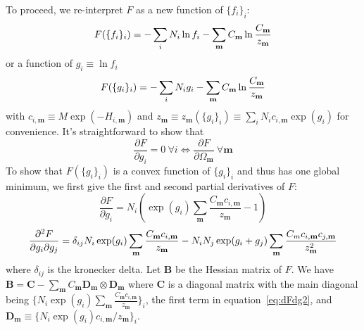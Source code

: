To proceed, we re-interpret $F$ as a new function of $\{f_{i}\}_{i}$:
\begin{equation}
F(\{f_{i}\}_{i}) = - \sum_{i}^{} N_i \ln f_{i} \\ 
-\sum_{\mathbf{m}}^{} C_{\mathbf{m}} \ln \frac{C_{\mathbf{m}}}{z_{\mathbf{m}}} 
\label{eq:Fexf}
\end{equation}
or a function of $g_{i} \equiv \ln f_{i}$
\begin{equation}
F(\{g_{i}\}_{i}) = - \sum_{i}^{} N_i g_{i} \\ 
-\sum_{\mathbf{m}}^{} C_{\mathbf{m}} \ln \frac{C_{\mathbf{m}}}{z_{\mathbf{m}}} 
\label{eq:Fexg}
\end{equation}
with $c_{i,\mathbf{m}} \equiv M \exp(-H_{i,\mathbf{m}})$ and 
$z_{\mathbf{m}} \equiv z_{\mathbf{m}}(\{g_{i}\}_{i}) \equiv \sum\limits_{i}^{} N_{i} c_{i,\mathbf{m}} \exp(g_{i})$ 
for convenience. It's straightforward to show that
\begin{equation}
\frac{\partial F}{\partial g_{i}} = 0 \: \forall i \Leftrightarrow \frac{\partial F}{\partial \Omega_{\mathbf{m}}} \: \forall \mathbf{m}
\label{eq:Fequiv}
\end{equation}
To show that $F(\{g_{i}\}_{i})$ is a convex function of $\{g_{i}\}_{i}$ and thus has one 
global minimum, we first give the first and second partial derivatives of $F$:
\begin{equation}
\frac{\partial F}{\partial g_{i}}  = N_{i} (\exp(g_{i}) \sum_{\mathbf{m}}^{} \frac{C_{\mathbf{m}} c_{i,\mathbf{m}} }{z_{\mathbf{m}}} -1)
\label{eq:dFdg}
\end{equation}
\begin{equation}
\frac{\partial^2 F }{\partial g_{i} \partial g_{j}} =  \\
\delta_{ij} N_{i} \exp(g_{i}) \sum_{\mathbf{m}}^{} \frac{C_{\mathbf{m}} c_{i,\mathbf{m}}}{z_{\mathbf{m}}} - \\
N_{i} N_{j} \exp(g_{i}+g_{j}) \sum_{\mathbf{m}}^{} \frac{C_{m}c_{i,\mathbf{m}}c_{j,\mathbf{m}}}{z_{\mathbf{m}}^2}
\label{eq:dFdg2}
\end{equation}
where $\delta_{ij}$ is the kronecker delta. Let $\mathbf{B}$ be the Hessian matrix of $F$. We 
have $\mathbf{B} = \mathbf{C} - \sum\limits_{\mathbf{m}}^{} C_{\mathbf{m}} \mathbf{D}_{\mathbf{m}} \otimes \mathbf{D}_{\mathbf{m}}$ 
where $\mathbf{C}$ is a diagonal matrix with the main diagonal being 
$\{N_{i} \exp(g_{i}) \sum\limits_{\mathbf{m}}^{} \frac{C_{\mathbf{m}} c_{i,\mathbf{m}}}{z_{\mathbf{m}}}\}_{i}$, 
the first term in equation~\ref{eq:dFdg2}, and $\mathbf{D}_{\mathbf{m}} \equiv \{N_{i} \exp(g_{i}) c_{i,\mathbf{m}}/z_{\mathbf{m}}\}_{i}$.
